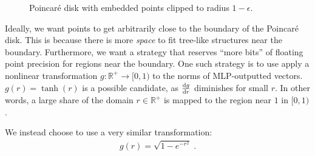 \documentclass{article}
\begin{document}
\begin{figure}[h]
  \centering
  \caption{Poincaré disk with embedded points clipped to radius $1 - \epsilon$.}
  \label{fig:poincare-disk-epsilon}
\end{figure}

Ideally, we want points to get arbitrarily close to the boundary of the Poincaré disk. This is because there is more \emph{space} to fit tree-like structures near the boundary. Furthermore, we want a strategy that reserves ``more bits'' of floating point precision for regions near the boundary. One such strategy is to use apply a nonlinear transformation $g: \mathbb R^+ \to [0, 1)$ to the norms of MLP-outputted vectors. $g(r) = \tanh(r)$ is a possible candidate, as $\dv{g}{r}$ diminishes for small $r$. In other words, a large share of the domain $r \in \mathbb R^+$ is mapped to the region near $1$ in $[0, 1)$.

We instead choose to use a very similar transformation:
\begin{align}
  g(r) = \sqrt{1 - e^{-r^2}} \; . \label{eq:radial-transformation}
\end{align}
\end{document}
